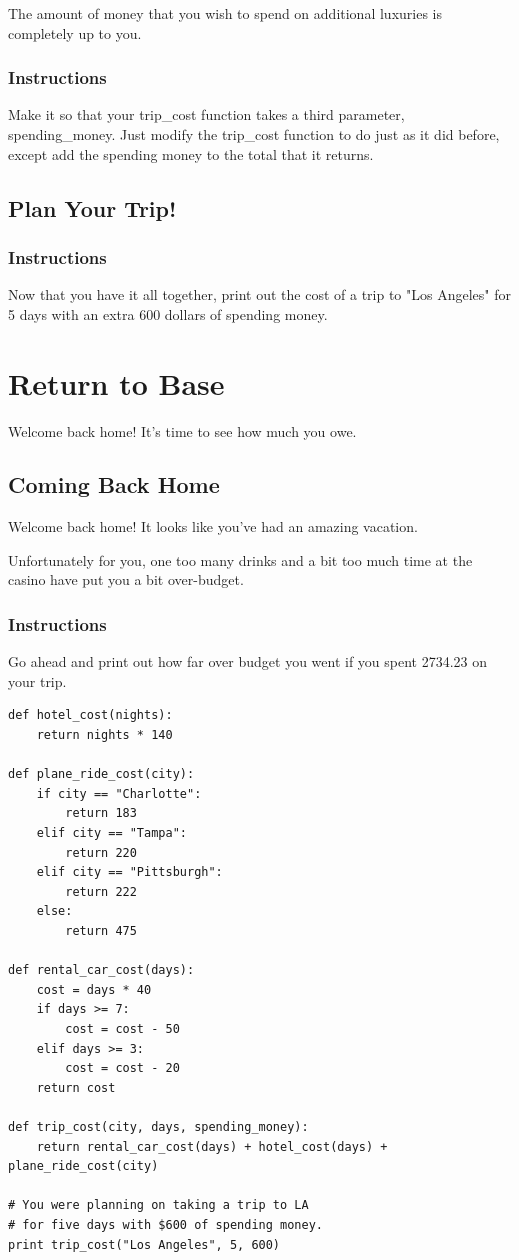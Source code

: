 \documentclass[12pt,a4paper,final,twoside,onecolumn,titlepage]{book}
\begin{document}
The amount of money that you wish to spend on additional luxuries is completely up to you.
\subsubsection{Instructions}

Make it so that your trip\_cost function takes a third parameter, spending\_money. Just modify the trip\_cost function to do just as it did before, except add the spending money to the total that it returns.

\subsection{Plan Your Trip!}
\subsubsection{Instructions}

Now that you have it all together, print out the cost of a trip to "Los Angeles" for 5 days with an extra 600 dollars of spending money.


\section{Return to Base}

    Welcome back home! It's time to see how much you owe.
\subsection{Coming Back Home}

Welcome back home! It looks like you've had an amazing vacation.

Unfortunately for you, one too many drinks and a bit too much time at the casino have put you a bit over-budget.
\subsubsection{Instructions}

Go ahead and print out how far over budget you went if you spent 2734.23 on your trip.
\begin{lstlisting}
def hotel_cost(nights):
    return nights * 140

def plane_ride_cost(city):
    if city == "Charlotte":
        return 183 
    elif city == "Tampa":
        return 220 
    elif city == "Pittsburgh": 
        return 222
    else:
        return 475

def rental_car_cost(days):
    cost = days * 40
    if days >= 7:
        cost = cost - 50
    elif days >= 3:
        cost = cost - 20
    return cost 

def trip_cost(city, days, spending_money):
    return rental_car_cost(days) + hotel_cost(days) + plane_ride_cost(city)

# You were planning on taking a trip to LA
# for five days with $600 of spending money.
print trip_cost("Los Angeles", 5, 600)
\end{lstlisting}
\end{document}
